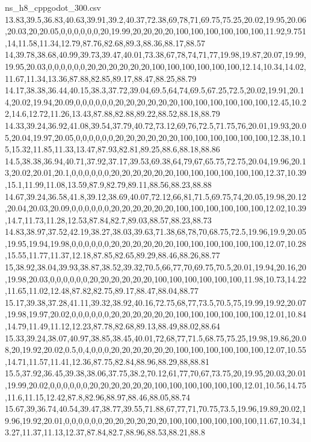 \begin{filecontents*}[overwrite]{ns_h8_cppgodot_300.csv}
13.83,39.5,36.83,40.63,39.91,39.2,40.37,72.38,69,78,71,69.75,75.25,20.02,19.95,20.06,20.03,20,20.05,0,0,0,0,0,0,20,19.99,20,20,20,20,100,100,100,100,100,100,11.92,9.751,14,11.58,11.34,12.79,87.76,82.68,89.3,88.36,88.17,88.57
14,39.78,38.68,40.99,39.73,39.47,40.01,73.38,67,78,74,71,77,19.98,19.87,20.07,19.99,19.95,20.03,0,0,0,0,0,0,20,20,20,20,20,20,100,100,100,100,100,100,12.14,10.34,14.02,11.67,11.34,13.36,87.88,82.85,89.17,88.47,88.25,88.79
14.17,38.38,36.44,40.15,38.3,37.72,39.04,69.5,64,74,69.5,67.25,72.5,20.02,19.91,20.14,20.02,19.94,20.09,0,0,0,0,0,0,20,20,20,20,20,20,100,100,100,100,100,100,12.45,10.22,14.6,12.72,11.26,13.43,87.88,82.88,89.22,88.52,88.18,88.79
14.33,39.24,36.92,41.08,39.54,37.79,40.72,73.12,69,76,72.5,71.75,76,20.01,19.93,20.05,20.04,19.97,20.05,0,0,0,0,0,0,20,20,20,20,20,20,100,100,100,100,100,100,12.38,10.15,15.32,11.85,11.33,13.47,87.93,82.81,89.25,88.6,88.18,88.86
14.5,38.38,36.94,40.71,37.92,37.17,39.53,69.38,64,79,67,65.75,72.75,20.04,19.96,20.13,20.02,20.01,20.1,0,0,0,0,0,0,20,20,20,20,20,20,100,100,100,100,100,100,12.37,10.39,15.1,11.99,11.08,13.59,87.9,82.79,89.11,88.56,88.23,88.88
14.67,39.24,36.58,41.8,39.12,38.69,40.07,72.12,66,81,71.5,69.75,74,20.05,19.98,20.12,20.04,20.03,20.09,0,0,0,0,0,0,20,20,20,20,20,20,100,100,100,100,100,100,12.02,10.39,14.7,11.73,11.28,12.53,87.84,82.7,89.03,88.57,88.23,88.73
14.83,38.97,37.52,42.19,38.27,38.03,39.63,71.38,68,78,70,68.75,72.5,19.96,19.9,20.05,19.95,19.94,19.98,0,0,0,0,0,0,20,20,20,20,20,20,100,100,100,100,100,100,12.07,10.28,15.55,11.77,11.37,12.18,87.85,82.65,89.29,88.46,88.26,88.77
15,38.92,38.04,39.93,38.87,38.52,39.32,70.5,66,77,70,69.75,70.5,20.01,19.94,20.16,20,19.98,20.03,0,0,0,0,0,0,20,20,20,20,20,20,100,100,100,100,100,100,11.98,10.73,14.22,11.65,11.02,12.48,87.82,82.75,89.17,88.47,88.04,88.77
15.17,39.38,37.28,41.11,39.32,38.92,40.16,72.75,68,77,73.5,70.5,75,19.99,19.92,20.07,19.98,19.97,20.02,0,0,0,0,0,0,20,20,20,20,20,20,100,100,100,100,100,100,12.01,10.84,14.79,11.49,11.12,12.23,87.78,82.68,89.13,88.49,88.02,88.64
15.33,39.24,38.07,40.97,38.85,38.45,40.01,72,68,77,71.5,68.75,75.25,19.98,19.86,20.08,20,19.92,20.02,0.5,0,4,0,0,0,20,20,20,20,20,20,100,100,100,100,100,100,12.07,10.55,14.71,11.57,11.41,12.36,87.75,82.84,88.96,88.29,88,88.81
15.5,37.92,36.45,39.38,38.06,37.75,38.2,70.12,61,77,70,67,73.75,20,19.95,20.03,20.01,19.99,20.02,0,0,0,0,0,0,20,20,20,20,20,20,100,100,100,100,100,100,12.01,10.56,14.75,11.6,11.15,12.42,87.8,82.96,88.97,88.46,88.05,88.74
15.67,39,36.74,40.54,39.47,38.77,39.55,71.88,67,77,71,70.75,73.5,19.96,19.89,20.02,19.96,19.92,20.01,0,0,0,0,0,0,20,20,20,20,20,20,100,100,100,100,100,100,11.67,10.34,13.27,11.37,11.13,12.37,87.84,82.7,88.96,88.53,88.21,88.8

\end{filecontents*}
